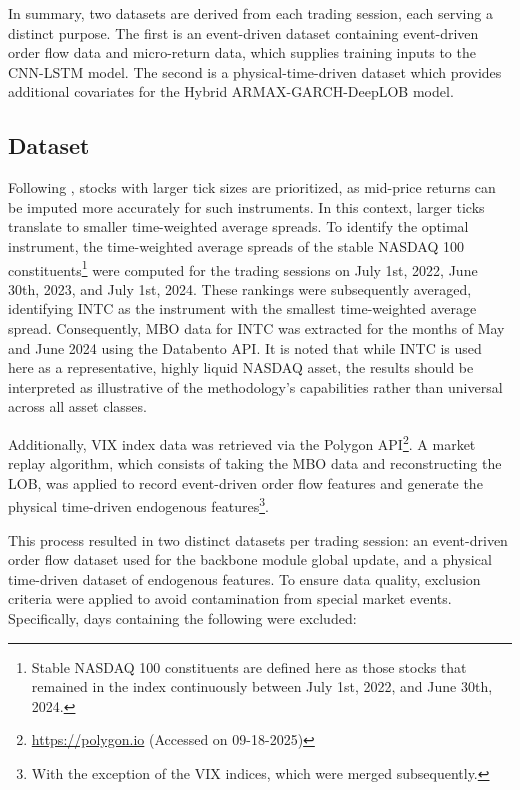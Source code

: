 \documentclass{rQUF2e}
\theoremstyle{plain}
\theoremstyle{definition}
\theoremstyle{remark}
\begin{document}
In summary, two datasets are derived from each trading session, each serving a distinct purpose. The first is an event-driven dataset containing event-driven order flow data and micro-return data, which supplies training inputs to the CNN-LSTM model. The second is a physical-time-driven dataset which provides additional covariates for the Hybrid ARMAX-GARCH-DeepLOB model.

\subsection{Dataset}
\label{subsec:dataset}

Following \citet{briola2024deep}, stocks with larger tick sizes are prioritized, as mid-price returns can be imputed more accurately for such instruments. In this context, larger ticks translate to smaller time-weighted average spreads. To identify the optimal instrument, the time-weighted average spreads of the stable NASDAQ 100 constituents\footnote{Stable NASDAQ 100 constituents are defined here as those stocks that remained in the index continuously between July 1st, 2022, and June 30th, 2024.} were computed for the trading sessions on July 1st, 2022, June 30th, 2023, and July 1st, 2024. These rankings were subsequently averaged, identifying INTC as the instrument with the smallest time-weighted average spread. Consequently, MBO data for INTC was extracted for the months of May and June 2024 using the Databento API. It is noted that while INTC is used here as a representative, highly liquid NASDAQ asset, the results should be interpreted as illustrative of the methodology's capabilities rather than universal across all asset classes.

Additionally, VIX index data was retrieved via the Polygon API\footnote{\url{https://polygon.io} (Accessed on 09-18-2025)}. A market replay algorithm, which consists of taking the MBO data and reconstructing the LOB, was applied to record event-driven order flow features and generate the physical time-driven endogenous features\footnote{With the exception of the VIX indices, which were merged subsequently.}.

This process resulted in two distinct datasets per trading session: an event-driven order flow dataset used for the backbone module global update, and a physical time-driven dataset of endogenous features. To ensure data quality, exclusion criteria were applied to avoid contamination from special market events. Specifically, days containing the following were excluded:
\end{document}
